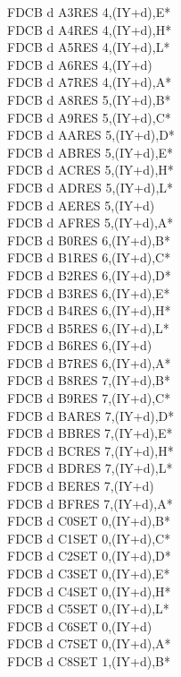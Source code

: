 \documentclass[oneside,a4paper]{book}
\begin{document}
\begin{multicols}{3}
{\begin{tabbing}
FDCB d A3\>RES 4,(IY+d),E*\\
FDCB d A4\>RES 4,(IY+d),H*\\
FDCB d A5\>RES 4,(IY+d),L*\\
FDCB d A6\>RES 4,(IY+d)\\
FDCB d A7\>RES 4,(IY+d),A*\\
FDCB d A8\>RES 5,(IY+d),B*\\
FDCB d A9\>RES 5,(IY+d),C*\\
FDCB d AA\>RES 5,(IY+d),D*\\
FDCB d AB\>RES 5,(IY+d),E*\\
FDCB d AC\>RES 5,(IY+d),H*\\
FDCB d AD\>RES 5,(IY+d),L*\\
FDCB d AE\>RES 5,(IY+d)\\
FDCB d AF\>RES 5,(IY+d),A*\\
FDCB d B0\>RES 6,(IY+d),B*\\
FDCB d B1\>RES 6,(IY+d),C*\\
FDCB d B2\>RES 6,(IY+d),D*\\
FDCB d B3\>RES 6,(IY+d),E*\\
FDCB d B4\>RES 6,(IY+d),H*\\
FDCB d B5\>RES 6,(IY+d),L*\\
FDCB d B6\>RES 6,(IY+d)\\
FDCB d B7\>RES 6,(IY+d),A*\\
FDCB d B8\>RES 7,(IY+d),B*\\
FDCB d B9\>RES 7,(IY+d),C*\\
FDCB d BA\>RES 7,(IY+d),D*\\
FDCB d BB\>RES 7,(IY+d),E*\\
FDCB d BC\>RES 7,(IY+d),H*\\
FDCB d BD\>RES 7,(IY+d),L*\\
FDCB d BE\>RES 7,(IY+d)\\
FDCB d BF\>RES 7,(IY+d),A*\\
FDCB d C0\>SET 0,(IY+d),B*\\
FDCB d C1\>SET 0,(IY+d),C*\\
FDCB d C2\>SET 0,(IY+d),D*\\
FDCB d C3\>SET 0,(IY+d),E*\\
FDCB d C4\>SET 0,(IY+d),H*\\
FDCB d C5\>SET 0,(IY+d),L*\\
FDCB d C6\>SET 0,(IY+d)\\
FDCB d C7\>SET 0,(IY+d),A*\\
FDCB d C8\>SET 1,(IY+d),B*\\

\end{tabbing}}
\end{multicols}
\end{document}

